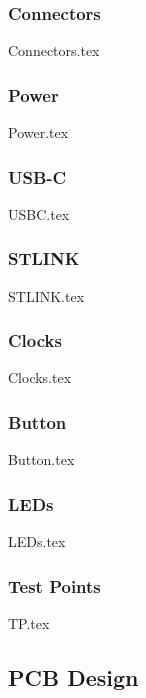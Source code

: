     \subsubsection{Connectors}\label{sec:v1-connectors}
        {Connectors.tex}

    \subsubsection{Power}\label{sec:v1-schematic-power}
        {Power.tex}

    \subsubsection{USB-C}
        {USBC.tex}

    \subsubsection{STLINK}\label{sec:v1-schematic-stlink}
        {STLINK.tex}

    \subsubsection{Clocks}
        {Clocks.tex}

    \subsubsection{Button}
        {Button.tex}

    \subsubsection{LEDs}
        {LEDs.tex}

    \subsubsection{Test Points}
        {TP.tex}

\subsection{PCB Design}\label{sec:v1-pcb}

